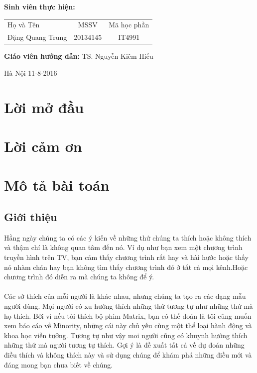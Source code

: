 \documentclass[a4paper,11pt]{report}
\begin{document}
\hspace{1cm}\fontsize{14}{16}\selectfont \textbf{Sinh viên thực hiện:}
\begin{longtable}{l c c }
Họ và Tên & MSSV &    Mã học phần \\[0.5cm]
Đặng Quang Trung &    20134145 & IT4991\\
\end{longtable}
\hspace{0.3cm}\fontsize{14}{16}\selectfont \textbf{Giáo viên hướng dẫn:} TS. Nguyễn Kiêm Hiếu\\[1.0cm]
\begin{center}
\fontsize{16}{19}\selectfont Hà Nội 11-8-2016
\end{center} 
\tableofcontents
\chapter*{Lời mở đầu}
\chapter*{Lời cảm ơn}
\chapter{Mô tả bài toán}
\section{Giới thiệu}
Hằng ngày chúng ta có các ý kiến về những thứ chúng ta thích hoặc không thích và thậm chí là không quan tâm đến nó. Ví dụ như bạn xem một chương trình truyền hình trên TV, bạn cảm thấy chương trình rất hay và hài hước hoặc thấy nó nhàm chán hay bạn không tìm thấy chương trình đó ở tất cả mọi kênh.Hoặc chương trình đó diễn ra mà chúng ta không để ý.\\ \\
Các sở thích của mỗi người là khác nhau, nhưng chúng ta tạo ra các dạng mẫu người dùng. Mọi người có xu hướng thích những thứ tương tự như những thứ mà họ thích. Bởi vì nếu tôi thích bộ phim Matrix, bạn có thế đoán là tôi cũng muốn xem báo cáo về  Minority, những cái này chủ yếu cùng một thể loại hành động và khoa học viễn tưởng. Tương tự như vậy moi người cũng có khuynh hướng thích những thứ mà người tương tự thích. Gợi ý là đề xuất tất cả về dự đoán những điều thích và không thích này và sử dụng chúng để khám phá những điều mới và đáng mong bạn chưa biết về chúng.
\end{document}
